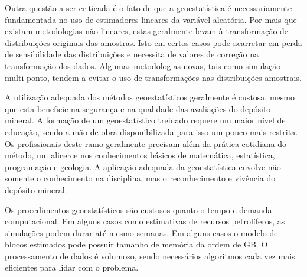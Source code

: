  Outra questão a ser criticada é o fato de que a geoestatística é necessariamente fundamentada no uso de estimadores lineares da variável aleatória. Por mais que existam metodologias não-lineares, estas geralmente levam à transformação de distribuições originais das amostras. Isto em certos casos pode acarretar em perda de sensibilidade das distribuições e necessita de valores de correção na transformação dos dados. Algumas metodologias novas, tais como simulação multi-ponto, tendem a evitar o uso de transformações nas distribuições amostrais.
 
 A utilização adequada dos métodos geoestatísticos geralmente é custosa, mesmo que esta beneficie na segurança e na qualidade das avaliações do depósito mineral. A formação de um geoestatístico treinado requere um maior nível de educação, sendo a mão-de-obra disponibilizada para isso um pouco mais restrita. Os profissionais deste ramo geralmente precisam além da prática cotidiana do método, um alicerce nos conhecimentos básicos de matemática, estatística, programação e geologia. A aplicação adequada da geoestatística envolve não somente o conhecimento na disciplina, mas o reconhecimento e vivência do depósito mineral.  
 
 Os procedimentos geoestatísticos são custosos quanto o tempo e demanda computacional. Em alguns casos como estimativas de recursos petrolíferos, as simulações podem durar até mesmo semanas. Em alguns casos o modelo de blocos estimados pode possuir tamanho de memória da ordem de GB. O processamento de dados é volumoso, sendo necessários algoritmos cada vez mais eficientes para lidar com o problema.  